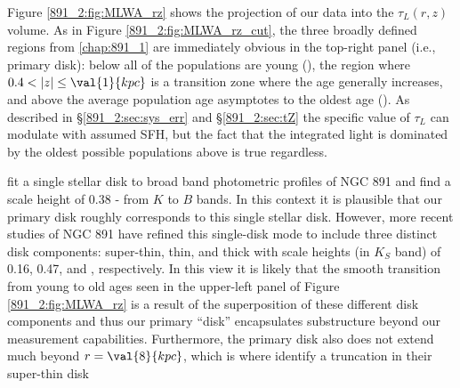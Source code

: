 Figure \ref{891_2:fig:MLWA_rz} shows the projection of our data into
the $\tau_L(r,z)$ volume. As in Figure \ref{891_2:fig:MLWA_rz_cut}, the
three broadly defined regions from \ref{chap:891_1} are immediately
obvious in the top-right panel (i.e., primary disk): below
 all of the populations are young (), the
region where $0.4 < |z| \leq \val{1}{kpc}$ is a transition zone where
the age generally increases, and above  the average
population age asymptotes to the oldest age (). As
described in \S\ref{891_2:sec:sys_err} and \S\ref{891_2:sec:tZ} the
specific value of $\tau_L$ can modulate with assumed SFH, but the fact
that the integrated light is dominated by the oldest possible
populations above  is true regardless.

\citet{Xilouris99} fit a single stellar disk to broad band photometric
profiles of NGC 891 and find a scale height of 0.38 - 
from $K$ to $B$ bands. In this context it is plausible that our
primary disk roughly corresponds to this single stellar disk. However,
more recent studies of NGC 891 \citep{Schechtman-Rook12,
  Schechtman-Rook13, Schechtman-Rook14} have refined this single-disk
mode to include three distinct disk components: super-thin, thin, and
thick with scale heights (in $K_S$ band) of 0.16, 0.47, and
, respectively. In this view it is likely that the
smooth transition from young to old ages seen in the upper-left panel
of Figure \ref{891_2:fig:MLWA_rz} is a result of the superposition of these
different disk components and thus our primary ``disk'' encapsulates
substructure beyond our measurement capabilities. Furthermore, the
primary disk also does not extend much beyond $r=\val{8}{kpc}$, which
is where \citet{Schechtman-Rook13} identify a truncation in their
super-thin disk



